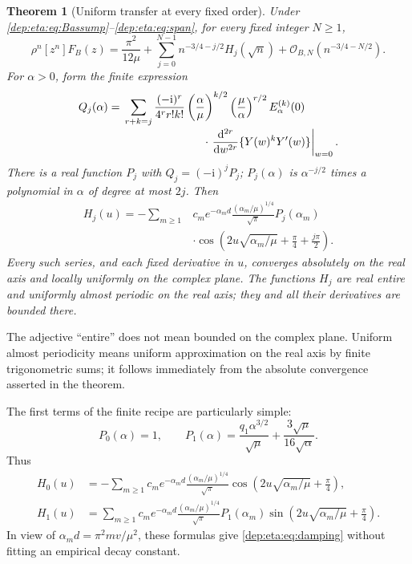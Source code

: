 \documentclass[11pt]{article}
\newtheorem{theorem}{Theorem}[section]
\theoremstyle{definition}\newtheorem{definition}[theorem]{Definition}
\theoremstyle{remark}\newtheorem{remark}[theorem]{Remark}
\newcommand{\OO}{\mathcal O}
\newcommand{\ii}{\mathrm i}
\begin{document}
\begin{theorem}[Uniform transfer at every fixed order]\label{dep:eta:thm:general}
Under \eqref{dep:eta:eq:Bassump}--\eqref{dep:eta:eq:span}, for every fixed integer
$N\ge1$,
\begin{equation}\label{dep:eta:eq:general}
 \rho^n[z^n]F_B(z)=\frac{\pi^2}{12\mu}
  +\sum_{j=0}^{N-1}n^{-3/4-j/2}H_j(\sqrt n)
  +\OO_{B,N}(n^{-3/4-N/2}).
\end{equation}
For $\alpha>0$, form the finite expression
\begin{equation}\label{dep:eta:eq:Qrecipe}
\begin{split}
 Q_j(\alpha)={}&\sum_{r+k=j}
 \frac{(-\ii)^r}{4^rr!k!}
 \left(\frac\alpha\mu\right)^{k/2}
 \left(\frac\mu\alpha\right)^{r/2}E_\alpha^{(k)}(0)\\[-2pt]
 &\hspace{25mm}\cdot
 \left.\frac{\mathrm d^{2r}}{\mathrm dw^{2r}}
                \{Y(w)^kY'(w)\}\right|_{w=0}.
\end{split}
\end{equation}
There is a real function $P_j$ with $Q_j=(-\ii)^jP_j$;
$P_j(\alpha)$ is $\alpha^{-j/2}$ times a polynomial in $\alpha$
of degree at most $2j$. Then
\begin{equation}\label{dep:eta:eq:Hrecipe}
\begin{split}
 H_j(u)=-\sum_{m\ge1}&c_m e^{-\alpha_md}
          \frac{(\alpha_m/\mu)^{1/4}}{\sqrt\pi}P_j(\alpha_m)\\
 &\cdot\cos\left(2u\sqrt{\alpha_m/\mu}+\frac\pi4+\frac{j\pi}2\right).
\end{split}
\end{equation}
Every such series, and each fixed derivative in $u$, converges
absolutely on the real axis and locally uniformly on the complex
plane. The functions $H_j$ are real entire and uniformly almost
periodic on the real axis; they and all their derivatives are bounded
there.
\end{theorem}

The adjective ``entire'' does not mean bounded on the complex plane.
Uniform almost periodicity means uniform approximation on the real
axis by finite trigonometric sums; it follows immediately from the
absolute convergence asserted in the theorem.

The first terms of the finite recipe are particularly simple:
\begin{equation}\label{dep:eta:eq:P01}
 P_0(\alpha)=1,\qquad
 P_1(\alpha)=\frac{q_1\alpha^{3/2}}{\sqrt\mu}
                      +\frac{3\sqrt\mu}{16\sqrt\alpha}.
\end{equation}
Thus
\begin{align}
 H_0(u)&=-\sum_{m\ge1}c_me^{-\alpha_md}
      \frac{(\alpha_m/\mu)^{1/4}}{\sqrt\pi}
      \cos\left(2u\sqrt{\alpha_m/\mu}+\frac\pi4\right),\label{dep:eta:eq:H0general}\\
 H_1(u)&=\sum_{m\ge1}c_me^{-\alpha_md}
      \frac{(\alpha_m/\mu)^{1/4}}{\sqrt\pi}P_1(\alpha_m)
      \sin\left(2u\sqrt{\alpha_m/\mu}+\frac\pi4\right).\label{dep:eta:eq:H1general}
\end{align}
In view of $\alpha_md=\pi^2mv/\mu^2$, these formulas give
\eqref{dep:eta:eq:damping} without fitting an empirical decay constant.
\end{document}
